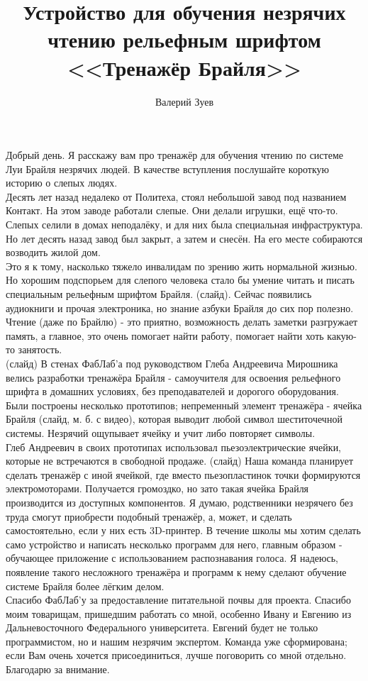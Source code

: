 \documentclass[a4paper,12pt]{article} %
\begin{document}
\title{Устройство для обучения незрячих чтению рельефным шрифтом <<Тренажёр Брайля>>}
\author{Валерий Зуев}
Добрый день. Я расскажу вам про тренажёр для обучения чтению по системе Луи Брайля незрячих людей. В качестве вступления послушайте короткую историю о слепых людях.\\
Десять лет назад недалеко от Политеха, стоял небольшой завод под названием Контакт. На этом заводе работали слепые. Они делали игрушки, ещё что-то. Слепых селили в домах неподалёку, и для них была специальная инфраструктура. Но лет десять назад завод был закрыт, а затем и снесён. На его месте собираются возводить жилой дом.\\
Это  я к тому, насколько тяжело инвалидам по зрению жить нормальной жизнью. Но хорошим подспорьем для слепого человека стало бы умение читать и писать специальным рельефным шрифтом Брайля. (слайд). Сейчас появились аудиокниги и прочая электроника, но знание азбуки Брайля до сих пор полезно. Чтение (даже по Брайлю) - это приятно, возможность делать заметки разгружает память, а главное, это очень помогает найти работу, помогает найти хоть какую-то занятость. \\
(слайд) В стенах ФабЛаб'а под руководством Глеба Андреевича Мирошника велись разработки тренажёра Брайля - самоучителя для освоения рельефного шрифта в домашних условиях, без преподавателей и дорогого оборудования. Были построены несколько прототипов; непременный элемент тренажёра - ячейка Брайля (слайд, м. б. с видео), которая выводит любой символ шеститочечной системы. Незрячий ощупывает ячейку и учит либо повторяет символы. \\
Глеб Андреевич в своих прототипах использовал пьезоэлектрические ячейки, которые не встречаются в свободной продаже.  (слайд) Наша команда планирует сделать тренажёр с иной ячейкой, где вместо пьезопластинок точки формируются электромоторами. Получается громоздко, но зато такая ячейка Брайля производится из доступных компонентов. Я думаю, родственники незрячего без труда смогут приобрести подобный тренажёр, а, может, и сделать самостоятельно, если у них есть 3D-принтер. В течение школы мы хотим сделать само устройство и написать несколько программ для него,  главным образом - обучающее приложение с использованием распознавания голоса. Я надеюсь, появление такого несложного тренажёра и программ к нему сделают обучение системе Брайля более лёгким делом.\\
Спасибо ФабЛаб'у за предоставление питательной почвы для проекта. Спасибо моим товарищам, пришедшим работать со мной, особенно Ивану и Евгению из Дальневосточного Федерального университета. Евгений будет не только программистом, но и нашим незрячим экспертом. Команда уже сформирована; если Вам очень хочется присоединиться, лучше поговорить со мной отдельно.\\
Благодарю за внимание.
\end{document}

